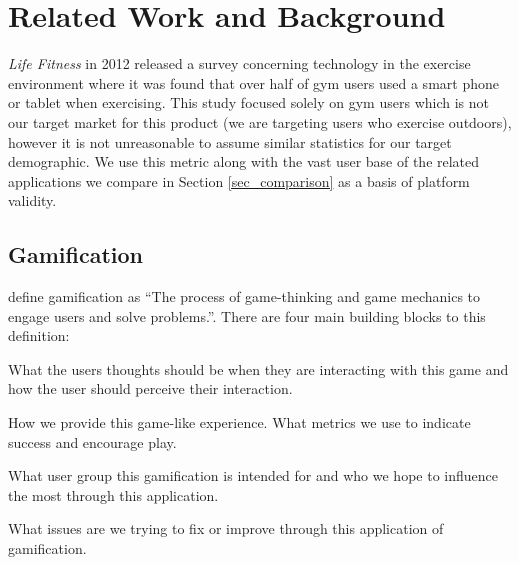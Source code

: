 \chapter{Related Work and Background}\label{ch_background}

\emph{Life Fitness} in 2012 released a survey concerning technology in the
exercise environment\cite{lifefitness} where it was found that over
half of gym users used a smart phone or tablet when exercising. This
study focused solely on gym users which is not our target market for
this product (we are targeting users who exercise outdoors), however
it is not unreasonable to assume similar statistics for our target
demographic. We use this metric along with the vast user base of the
related applications we compare in Section \ref{sec_comparison} as a
basis of platform validity. 

\section{Gamification}
\label{sec:gamification}
\citet{gamification_book} define gamification as ``The process of
game-thinking and game mechanics to engage users and solve
problems.''. There are four main building blocks to this definition:

\begin{description}[style=multiline, leftmargin=3cm]
\item[\emph{game-thinking}] What the users thoughts should be when
  they are interacting with this game and how the user should perceive
  their interaction.
\item[\emph{game mechanics}] How we provide this game-like
  experience. What metrics we use to indicate success and encourage
  play. 
\item[\emph{users}] What user group this gamification is intended for
  and who we hope to influence the most through this application.
\item[\emph{problems}] What issues are we trying to fix or improve
  through this application of gamification.
\end{description}

